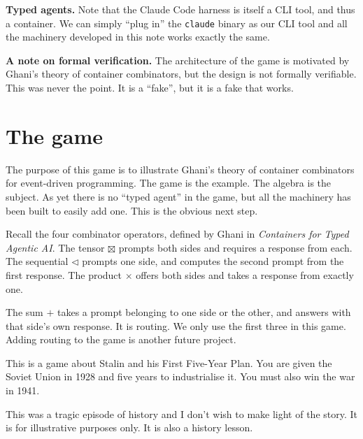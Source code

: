 \documentclass[11pt,a4paper]{article}
\begin{document}
\begin{orestisbox}
\textbf{Typed agents.} Note that the Claude Code harness is itself a CLI tool, and thus a
container. We can
simply ``plug in'' the \texttt{claude} binary as our CLI tool and all the machinery developed in
this note works exactly the same.
\end{orestisbox}

\begin{pinkbox}
\textbf{A note on formal verification.} The architecture of the game is motivated by Ghani's theory
of container combinators, but the design is not formally verifiable. This was never the point. It
is a ``fake'', but it is a fake that works.
\end{pinkbox}

\newpage

\tableofcontents

\newpage

\section{The game}
\label{sec:game}

The purpose of this game is to illustrate Ghani's theory of container combinators for
event-driven programming. The game is the example. The algebra is the subject. As yet there is no
``typed agent'' in the game, but all the machinery has been built to easily add one. This is the
obvious next step.

Recall the four combinator operators, defined by Ghani in \emph{Containers for Typed Agentic AI}.
The tensor $\boxtimes$ prompts both sides
and requires a response from each. The sequential $\lhd$ prompts one side, and computes the second
prompt from the first response. The product $\times$ offers both sides and takes a response from
exactly one.

The sum $+$ takes a prompt belonging to one side or the other, and answers with that side's own
response. It is routing. We only use the first three in this game. Adding routing to the game is
another future project.

This is a game about Stalin and his First Five-Year Plan. You are given the Soviet Union in 1928
and five years to industrialise it. You must also win the war in 1941.

This was a tragic episode of history and I don't wish to make light of the story. It is for
illustrative purposes only. It is also a history lesson.

\vspace{6mm}
\end{document}
